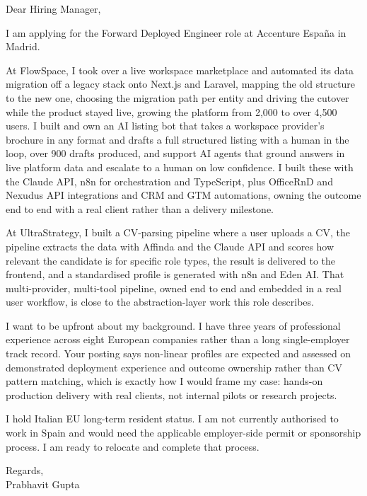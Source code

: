 \documentclass[a4paper,11pt]{article}
\begin{document}
Dear Hiring Manager,

I am applying for the Forward Deployed Engineer role at Accenture Espa\~{n}a in Madrid.

At FlowSpace, I took over a live workspace marketplace and automated its data migration off a legacy stack onto Next.js and Laravel, mapping the old structure to the new one, choosing the migration path per entity and driving the cutover while the product stayed live, growing the platform from 2,000 to over 4,500 users. I built and own an AI listing bot that takes a workspace provider's brochure in any format and drafts a full structured listing with a human in the loop, over 900 drafts produced, and support AI agents that ground answers in live platform data and escalate to a human on low confidence. I built these with the Claude API, n8n for orchestration and TypeScript, plus OfficeRnD and Nexudus API integrations and CRM and GTM automations, owning the outcome end to end with a real client rather than a delivery milestone.

At UltraStrategy, I built a CV-parsing pipeline where a user uploads a CV, the pipeline extracts the data with Affinda and the Claude API and scores how relevant the candidate is for specific role types, the result is delivered to the frontend, and a standardised profile is generated with n8n and Eden AI. That multi-provider, multi-tool pipeline, owned end to end and embedded in a real user workflow, is close to the abstraction-layer work this role describes.

I want to be upfront about my background. I have three years of professional experience across eight European companies rather than a long single-employer track record. Your posting says non-linear profiles are expected and assessed on demonstrated deployment experience and outcome ownership rather than CV pattern matching, which is exactly how I would frame my case: hands-on production delivery with real clients, not internal pilots or research projects.

I hold Italian EU long-term resident status. I am not currently authorised to work in Spain and would need the applicable employer-side permit or sponsorship process. I am ready to relocate and complete that process.

Regards,\\
Prabhavit Gupta
\end{document}
